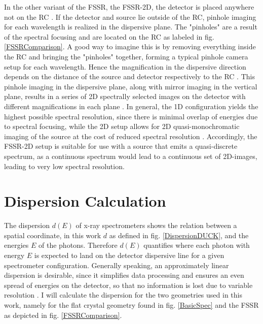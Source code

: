 In the other variant of the FSSR, the FSSR-2D, the detector is placed anywhere 
not on the RC 
\citep{faenov1994}. If the detector and source lie outside of the RC, pinhole 
imaging for each 
wavelength is realized in the dispersive plane. The "pinholes" are a result of 
the spectral 
focusing and are located on the RC as labeled in fig. \ref{FSSRComparison}. A 
good way to imagine 
this is by removing everything inside the RC and bringing the "pinholes" 
together, forming a 
typical pinhole camera setup for each wavelength. Hence 
the magnification in the dispersive direction depends on the 
distance of the source and detector respectively to the RC 
\citep{renner2019challenges}. This pinhole imaging in the dispersive plane, 
along with mirror 
imaging in the vertical plane, results in a series of 2D spectrally selected 
images on the 
detector with different magnifications in each plane \citep{pikuz1995bragg}. In 
general, the 1D 
configuration yields the highest possible spectral resolution, since there is 
minimal overlap of energies due to spectral focusing, while the 2D setup allows 
for 2D 
quasi-monochromatic imaging of the source at the cost of reduced spectral 
resolution \citep{renner2019challenges}. Accordingly, the FSSR-2D setup is 
suitable for use with a 
source that emits a quasi-discrete spectrum, as a continuous spectrum would 
lead to a continuous 
set of 2D-images, leading to very low spectral resolution.




\section{Dispersion Calculation}
\label{section:dispersion calculation}
The dispersion $d(E)$ of x-ray spectrometers shows the relation between a spatial 
coordinate, in this work $d$ as defined in fig. \ref{DispersionDUCK}, and the energies $E$ of the photons. Therefore $d(E)$ 
quantifies where each photon with energy $E$ is expected to land on the 
detector dispersive line for a given spectrometer configuration. Generally 
speaking, an approximately linear dispersion is desirable, since it simplifies 
data processing and ensures an even spread of energies on the detector, so that 
no information is lost due to variable resolution \citep{yang2011focusing}. I 
will calculate the dispersion for the two geometries used in this work, 
namely for the flat crystal geometry found in fig. \ref{BasicSpec} and the 
FSSR as depicted in fig. \ref{FSSRComparison}. 

